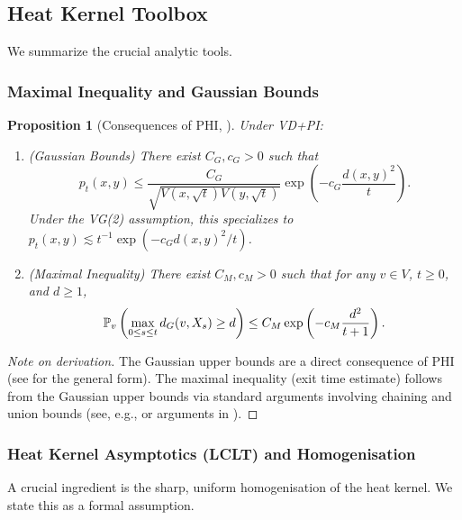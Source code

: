 \documentclass{article}
\numberwithin{equation}{section}
\newtheorem{proposition}[theorem]{Proposition}
\theoremstyle{definition}
\theoremstyle{remark}
\newcommand{\Prob}{\mathbb{P}}
\begin{document}
\subsection{Heat Kernel Toolbox}
We summarize the crucial analytic tools.

\subsubsection{Maximal Inequality and Gaussian Bounds}

\begin{proposition}[Consequences of PHI, \cite{Delmotte99, Grigoryan09}]\label{prop:maximal}
Under VD+PI:
\begin{enumerate}
    \item (Gaussian Bounds) There exist $C_G, c_G > 0$ such that
    \[
    p_t(x,y) \leq \frac{C_G}{\sqrt{V(x,\sqrt{t}) V(y,\sqrt{t})}} \exp\left(-c_G \frac{d(x,y)^2}{t}\right).
    \]
    Under the VG(2) assumption, this specializes to $p_t(x,y) \lesssim t^{-1} \exp(-c_G d(x,y)^2/t)$.
    \item (Maximal Inequality) There exist $C_M,c_M > 0$ such that for any $v \in V$, $t \geq 0$, and $d \geq 1$,
    \begin{equation}\label{eq:max_ineq}
    \small
    \Prob_v\left( \max_{0 \leq s \leq t} d_G(v,X_s) \geq d \right) \leq C_M \exp\left(-c_M \frac{d^2}{t+1}\right).
    \end{equation}
\end{enumerate}
\end{proposition}
\begin{proof}[Note on derivation]
The Gaussian upper bounds are a direct consequence of PHI (see \cite{Delmotte99} for the general form). The maximal inequality (exit time estimate) follows from the Gaussian upper bounds via standard arguments involving chaining and union bounds (see, e.g., \cite[Theorem 5.5.3]{Grigoryan09} or arguments in \cite{Delmotte99}).
\end{proof}


\subsubsection{Heat Kernel Asymptotics (LCLT) and Homogenisation}
A crucial ingredient is the sharp, uniform homogenisation of the heat kernel. We state this as a formal assumption.
\end{document}
